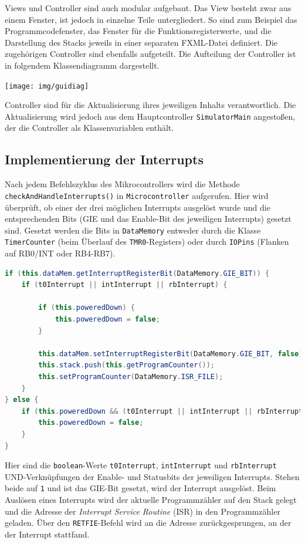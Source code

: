 \documentclass[a4paper]{article}
\begin{document}
Views und Controller sind auch modular aufgebaut.
Das View besteht zwar aus einem Fenster, ist jedoch in einzelne Teile untergliedert.
So sind zum Beispiel das Programmcodefenster, das Fenster für die Funktionsregisterwerte, und die Darstellung des Stacks jeweils in einer separaten FXML-Datei definiert.
Die zugehörigen Controller sind ebenfalls aufgeteilt.
Die Aufteilung der Controller ist in folgendem Klassendiagramm dargestellt.

\begin{center}
    \texttt{[image: img/guidiag]}
\end{center}

Controller sind für die Aktualisierung ihres jeweiligen Inhalts verantwortlich.
Die Aktualisierung wird jedoch aus dem Hauptcontroller \texttt{SimulatorMain} angestoßen, der die Controller als Klassenvariablen enthält.

\subsection{Implementierung der Interrupts}

Nach jedem Befehlszyklus des Mikrocontrollers wird die Methode \texttt{checkAndHandleInterrupts()} in \texttt{Microcontroller} aufgerufen.
Hier wird überprüft, ob einer der drei möglichen Interrupts ausgelöst wurde und die entsprechenden Bits (GIE und das Enable-Bit des jeweiligen Interrupts) gesetzt sind.
Gesetzt werden die Bits in \texttt{DataMemory} entweder durch die Klasse \texttt{TimerCounter} (beim Überlauf des \texttt{TMR0}-Registers) oder durch \texttt{IOPins} (Flanken auf RB0/INT oder RB4-RB7).

\begin{lstlisting}[language=Java,basicstyle=\ttfamily,columns=fullflexible]
if (this.dataMem.getInterruptRegisterBit(DataMemory.GIE_BIT)) {
    if (t0Interrupt || intInterrupt || rbInterrupt) {

        if (this.poweredDown) {
            this.poweredDown = false;
        }

        this.dataMem.setInterruptRegisterBit(DataMemory.GIE_BIT, false);
        this.stack.push(this.getProgramCounter());
        this.setProgramCounter(DataMemory.ISR_FILE);
    }
} else {
    if (this.poweredDown && (t0Interrupt || intInterrupt || rbInterrupt)) {
        this.poweredDown = false;
    }
}
\end{lstlisting}

Hier sind die \texttt{boolean}-Werte \texttt{t0Interrupt}, \texttt{intInterrupt} und \texttt{rbInterrupt} UND-Verknüpfungen der Enable- und Statusbits der jeweiligen Interrupts.
Stehen beide auf \texttt{1} und ist das GIE-Bit gesetzt, wird der Interrupt ausgelöst.
Beim Auslösen eines Interrupts wird der aktuelle Programmzähler auf den Stack gelegt und die Adresse der \textit{Interrupt Service Routine} (ISR) in den Programmzähler geladen.
Über den \texttt{RETFIE}-Befehl wird an die Adresse zurückgesprungen, an der der Interrupt stattfand.
\end{document}
